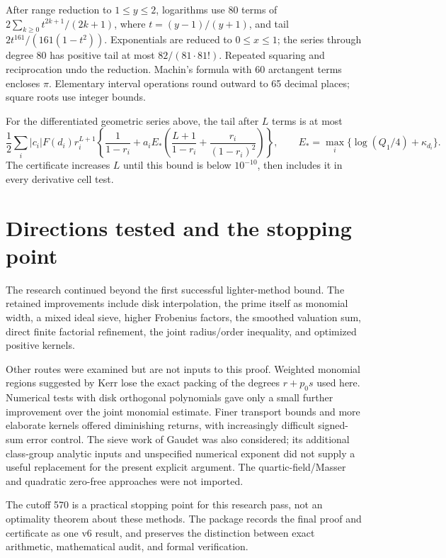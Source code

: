 \documentclass[11pt]{article}
\begin{document}
After range reduction to \(1\le y\le2\), logarithms use 80 terms
of \(2\sum_{k\ge0}t^{2k+1}/(2k+1)\), where
\(t=(y-1)/(y+1)\), and tail
\(2t^{161}/(161(1-t^2))\). Exponentials are reduced to
\(0\le x\le1\); the series through degree 80 has positive tail
at most \(82/(81\cdot81!)\). Repeated squaring and reciprocation
undo the reduction. Machin's formula with 60 arctangent terms
encloses \(\pi\). Elementary interval operations round outward
to 65 decimal places; square roots use integer bounds.

For the differentiated geometric series above, the tail after
\(L\) terms is at most
\[
 \frac12\sum_i |c_i|F(d_i)r_i^{L+1}
 \left\{\frac1{1-r_i}+a_i E_*
       \left(\frac{L+1}{1-r_i}+\frac{r_i}{(1-r_i)^2}\right)\right\},
 \qquad E_*=\max_i\{\log(Q_1/4)+\kappa_{d_i}\}.
\]
The certificate increases \(L\) until this bound is below
\(10^{-10}\), then includes it in every derivative cell test.

\section{Directions tested and the stopping point}
The research continued beyond the first successful lighter-method
bound. The retained improvements include disk interpolation, the
prime itself as monomial width, a mixed ideal sieve, higher Frobenius
factors, the smoothed valuation sum, direct finite factorial refinement,
the joint radius/order inequality, and optimized positive kernels.

Other routes were examined but are not inputs to this proof.
Weighted monomial regions suggested by Kerr lose the exact packing
of the degrees \(r+p_0s\) used here. Numerical tests with disk
orthogonal polynomials gave only a small further improvement over
the joint monomial estimate. Finer transport bounds and more elaborate
kernels offered diminishing returns, with increasingly difficult
signed-sum error control. The sieve work of Gaudet \cite{gaudet}
was also considered; its additional class-group analytic inputs and
unspecified numerical exponent did not supply a useful replacement
for the present explicit argument. The quartic-field/Masser and
quadratic zero-free approaches were not imported.

The cutoff 570 is a practical stopping point for this research pass,
not an optimality theorem about these methods. The package records
the final proof and certificate as one v6 result, and preserves the
distinction between exact arithmetic, mathematical audit, and formal
verification.
\end{document}
